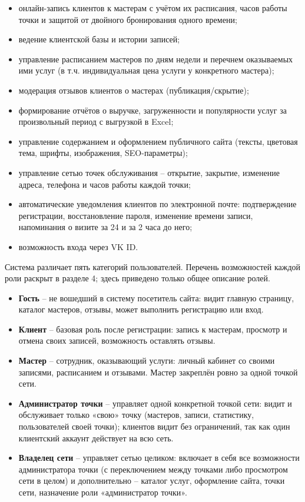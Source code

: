 \begin{itemize}
  \item онлайн-запись клиентов к мастерам с учётом их расписания, часов
        работы точки и защитой от двойного бронирования одного времени;
  \item ведение клиентской базы и истории записей;
  \item управление расписанием мастеров по дням недели и перечнем
        оказываемых ими услуг (в т.ч. индивидуальная цена услуги у
        конкретного мастера);
  \item модерация отзывов клиентов о мастерах (публикация/скрытие);
  \item формирование отчётов о выручке, загруженности и популярности услуг
        за произвольный период с выгрузкой в Excel;
  \item управление содержанием и оформлением публичного сайта (тексты,
        цветовая тема, шрифты, изображения, SEO-параметры);
  \item управление сетью точек обслуживания -- открытие, закрытие,
        изменение адреса, телефона и часов работы каждой точки;
  \item автоматические уведомления клиентов по электронной почте:
        подтверждение регистрации, восстановление пароля, изменение
        времени записи, напоминания о визите за 24 и за 2 часа до него;
  \item возможность входа через VK ID.
\end{itemize}


Система различает пять категорий пользователей. Перечень возможностей
каждой роли раскрыт в разделе 4; здесь приведено только общее описание
ролей.

\begin{itemize}
  \item \textbf{Гость} -- не вошедший в систему посетитель сайта: видит
        главную страницу, каталог мастеров, отзывы, может выполнить
        регистрацию или вход.
  \item \textbf{Клиент} -- базовая роль после регистрации: запись к
        мастерам, просмотр и отмена своих записей, возможность оставлять отзывы.
  \item \textbf{Мастер} -- сотрудник, оказывающий услуги: личный кабинет со
        своими записями, расписанием и отзывами. Мастер закреплён
        ровно за одной точкой сети.
  \item \textbf{Администратор точки} -- управляет одной конкретной точкой
        сети: видит и обслуживает только «свою» точку (мастеров, записи,
        статистику, пользователей своей точки); клиентов видит без
        ограничений, так как один клиентский аккаунт действует на всю
        сеть.
  \item \textbf{Владелец сети} -- управляет сетью целиком: включает в себя
        все возможности администратора точки (с переключением между
        точками либо просмотром сети в целом) и дополнительно --
        каталог услуг, оформление сайта, точки сети, назначение роли
        «администратор точки».
\end{itemize}

